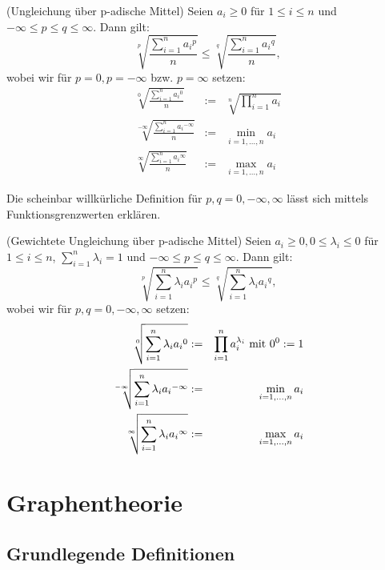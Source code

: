 \documentclass[10pt]{scrbook}
\begin{document}
\begin{Sa} (Ungleichung über p-adische Mittel)
\label{sa:padische_mittel}
Seien $a_i \geq 0$ für $1\leq i\leq n$ und $-\infty \leq p\leq q\leq \infty$. Dann gilt:
\begin{equation}
\sqrt[p]{\frac{\sum_{i=1}^n {a_i}^p}{n}} \leq \sqrt[q]{\frac{\sum_{i=1}^n {a_i}^q}{n}},
\end{equation}
wobei wir für $p=0, p=-\infty$ bzw. $p=\infty$ setzen:
\begin{eqnarray*}
\sqrt[0]{\frac{\sum_{i=1}^n {a_i}^0}{n}} & := & \sqrt[n]{\prod_{i=1}^n a_i}\\
\sqrt[-\infty]{\frac{\sum_{i=1}^n {a_i}^{-\infty}}{n}} & := & \min_{i=1, \ldots, n} a_i \\
\sqrt[\infty]{\frac{\sum_{i=1}^n {a_i}^\infty}{n}} & := & \max_{i=1, \ldots, n} a_i
\end{eqnarray*}
\end{Sa}

\begin{Bem}
Die scheinbar willkürliche Definition für $p, q=0, -\infty, \infty$ lässt sich mittels Funktionsgrenzwerten erklären.
\end{Bem}

\begin{Kor} (Gewichtete Ungleichung über p-adische Mittel)
Seien $a_i \geq 0, 0\leq \lambda_i\leq 0$ für $1\leq i\leq n$, $\sum_{i=1}^n \lambda_i=1$ und $-\infty \leq p\leq q\leq \infty$. Dann gilt:
\begin{equation}
\sqrt[p]{\sum_{i=1}^n \lambda_i {a_i}^p} \leq \sqrt[q]{\sum_{i=1}^n \lambda_i {a_i}^q},
\end{equation}
wobei wir für $p, q=0, -\infty, \infty$ setzen:
\begin{eqnarray*}
\sqrt[0]{\sum_{i=1}^n \lambda_i {a_i}^0} & := & \prod_{i=1}^n a_i^{\lambda_i} \textnormal{ mit }0^0:=1 \\
\sqrt[-\infty]{\sum_{i=1}^n \lambda_i {a_i}^{-\infty}} & := & \min_{i=1, \ldots, n} a_i \\
\sqrt[\infty]{\sum_{i=1}^n \lambda_i {a_i}^\infty} & := & \max_{i=1, \ldots, n} a_i
\end{eqnarray*}
\end{Kor}

\chapter{Graphentheorie}

\section{Grundlegende Definitionen}
\end{document}
